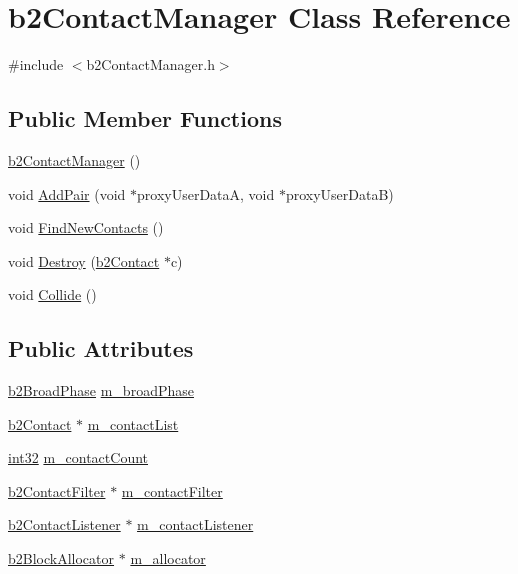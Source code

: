\hypertarget{classb2_contact_manager}{}\section{b2\+Contact\+Manager Class Reference}
\label{classb2_contact_manager}


{\ttfamily \#include $<$b2\+Contact\+Manager.\+h$>$}

\subsection*{Public Member Functions}
\begin{DoxyCompactItemize}
\item 
\mbox{\hyperlink{classb2_contact_manager_aec0a437c9d144fd976247a7acabb666d}{b2\+Contact\+Manager}} ()
\item 
void \mbox{\hyperlink{classb2_contact_manager_ae67a458b64b02bea19955c19cb1fd6f4}{Add\+Pair}} (void $\ast$proxy\+User\+DataA, void $\ast$proxy\+User\+DataB)
\item 
void \mbox{\hyperlink{classb2_contact_manager_af72699f83d5a449251c9f93459e0cc40}{Find\+New\+Contacts}} ()
\item 
void \mbox{\hyperlink{classb2_contact_manager_a0c331884df23a930837933fc77c9a99b}{Destroy}} (\mbox{\hyperlink{classb2_contact}{b2\+Contact}} $\ast$c)
\item 
void \mbox{\hyperlink{classb2_contact_manager_a3380f85adf40f542a7ad6f2e63a76ac6}{Collide}} ()
\end{DoxyCompactItemize}
\subsection*{Public Attributes}
\begin{DoxyCompactItemize}
\item 
\mbox{\hyperlink{classb2_broad_phase}{b2\+Broad\+Phase}} \mbox{\hyperlink{classb2_contact_manager_af85a9c7b0fb138b9fb635dbcf3b0b482}{m\+\_\+broad\+Phase}}
\item 
\mbox{\hyperlink{classb2_contact}{b2\+Contact}} $\ast$ \mbox{\hyperlink{classb2_contact_manager_aaca5f490daffabd29f7ad809921224b3}{m\+\_\+contact\+List}}
\item 
\mbox{\hyperlink{b2_settings_8h_a43d43196463bde49cb067f5c20ab8481}{int32}} \mbox{\hyperlink{classb2_contact_manager_a115b2f9bf38ffd045b26ae91ea696288}{m\+\_\+contact\+Count}}
\item 
\mbox{\hyperlink{classb2_contact_filter}{b2\+Contact\+Filter}} $\ast$ \mbox{\hyperlink{classb2_contact_manager_accf0e9232b9eeff002220ecb8d37a17f}{m\+\_\+contact\+Filter}}
\item 
\mbox{\hyperlink{classb2_contact_listener}{b2\+Contact\+Listener}} $\ast$ \mbox{\hyperlink{classb2_contact_manager_ac3565501f5ab42323050712b244bfe9a}{m\+\_\+contact\+Listener}}
\item 
\mbox{\hyperlink{classb2_block_allocator}{b2\+Block\+Allocator}} $\ast$ \mbox{\hyperlink{classb2_contact_manager_a20c57f602aa349239df715de5294821d}{m\+\_\+allocator}}
\end{DoxyCompactItemize}


